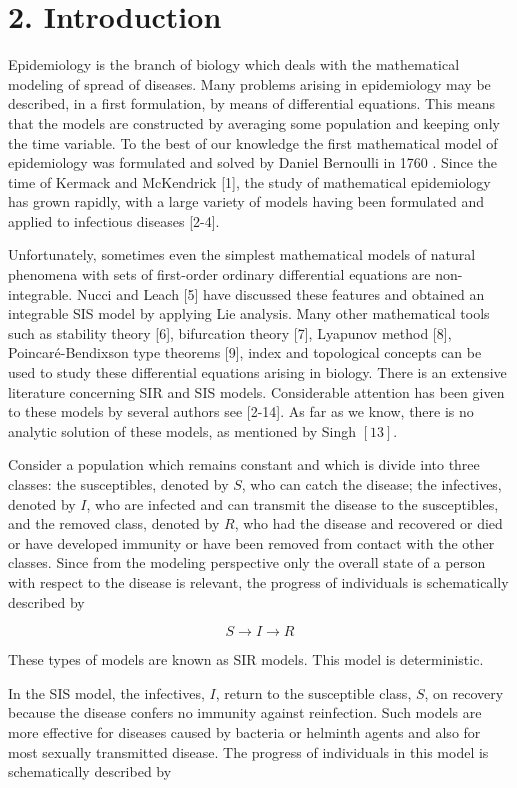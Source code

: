 \documentclass[10pt]{article}
\begin{document}
\section*{2. Introduction}
Epidemiology is the branch of biology which deals with the mathematical modeling of spread of diseases. Many problems arising in epidemiology may be described, in a first formulation, by means of differential equations. This means that the models are constructed by averaging some population and keeping only the time variable. To the best of our knowledge the first mathematical model of epidemiology was formulated and solved by Daniel Bernoulli in 1760 . Since the time of Kermack and McKendrick [1], the study of mathematical epidemiology has grown rapidly, with a large variety of models having been formulated and applied to infectious diseases [2-4].

Unfortunately, sometimes even the simplest mathematical models of natural phenomena with sets of first-order ordinary differential equations are non-integrable. Nucci and Leach [5] have discussed these features and obtained an integrable SIS model by applying Lie analysis. Many other mathematical tools such as stability theory [6], bifurcation theory [7], Lyapunov method [8], Poincaré-Bendixson type theorems [9], index and topological concepts can be used to study these differential equations arising in biology. There is an extensive literature concerning SIR and SIS models. Considerable attention has been given to these models by several authors see [2-14]. As far as we know, there is no analytic solution of these models, as mentioned by Singh $[13]$.

Consider a population which remains constant and which is divide into three classes: the susceptibles, denoted by $S$, who can catch the disease; the infectives, denoted by $I$, who are infected and can transmit the disease to the susceptibles, and the removed class, denoted by $R$, who had the disease and recovered or died or have developed immunity or have been removed from contact with the other classes. Since from the modeling perspective only the overall state of a person with respect to the disease is relevant, the progress of individuals is schematically described by

$$
S \rightarrow I \rightarrow R
$$




These types of models are known as SIR models. This model is deterministic.

In the SIS model, the infectives, $I$, return to the susceptible class, $S$, on recovery because the disease confers no immunity against reinfection. Such models are more effective for diseases caused by bacteria or helminth agents and also for most sexually transmitted disease. The progress of individuals in this model is schematically described by
\end{document}
